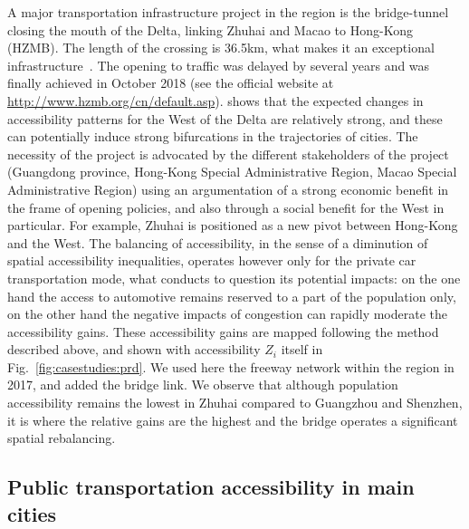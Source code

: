 \documentclass[11pt]{article}
\begin{document}
A major transportation infrastructure project in the region is the bridge-tunnel closing the mouth of the Delta, linking Zhuhai and Macao to Hong-Kong (HZMB). The length of the crossing is 36.5km, what makes it an exceptional infrastructure~\citep{hussain2011hong}. The opening to traffic was delayed by several years and was finally achieved in October 2018 (see the official website at \url{http://www.hzmb.org/cn/default.asp}). \cite{zhou2016medium} shows that the expected changes in accessibility patterns for the West of the Delta are relatively strong, and these can potentially induce strong bifurcations in the trajectories of cities. The necessity of the project is advocated by the different stakeholders of the project (Guangdong province, Hong-Kong Special Administrative Region, Macao Special Administrative Region) using an argumentation of a strong economic benefit in the frame of opening policies, and also through a social benefit for the West in particular. For example, Zhuhai is positioned as a new pivot between Hong-Kong and the West. The balancing of accessibility, in the sense of a diminution of spatial accessibility inequalities, operates however only for the private car transportation mode, what conducts to question its potential impacts: on the one hand the access to automotive remains reserved to a part of the population only, on the other hand the negative impacts of congestion can rapidly moderate the accessibility gains. These accessibility gains are mapped following the method described above, and shown with accessibility $Z_i$ itself in Fig.~\ref{fig:casestudies:prd}. We used here the freeway network within the region in 2017, and added the bridge link. We observe that although population accessibility remains the lowest in Zhuhai compared to Guangzhou and Shenzhen, it is where the relative gains are the highest and the bridge operates a significant spatial rebalancing.






\subsection{Public transportation accessibility in main cities}
\end{document}
